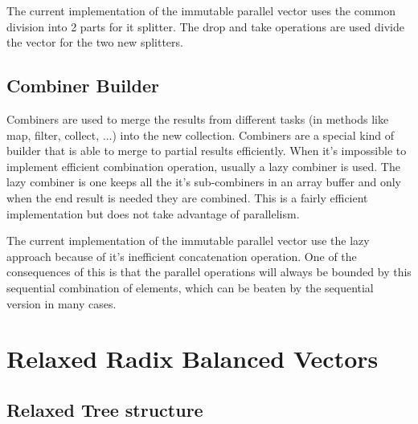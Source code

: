 The current implementation of the immutable parallel  vector \cite{scalaParVector211}  uses the common division into 2 parts for it splitter. The drop and take operations are used divide the vector for the two new splitters.


\subsection{Combiner Builder}
Combiners are used to merge the results from different tasks (in methods like map, filter, collect, ...) into the new collection. Combiners are a special kind of builder that is able to merge to partial results efficiently. When it's impossible to implement efficient combination operation, usually a lazy combiner is used. The lazy combiner is one keeps all the it's sub-combiners in an array buffer and only when the end result is needed they are combined. This is a fairly efficient implementation but does not take advantage of parallelism. 

The current implementation of the immutable parallel vector \cite{scalaParVector211} use the lazy approach because of it's inefficient concatenation operation. One of the consequences of this is that the parallel operations will always be bounded by this sequential combination of elements, which can be beaten by the sequential version in many cases.
 


\section{Relaxed Radix Balanced Vectors}


\subsection{Relaxed Tree structure}

